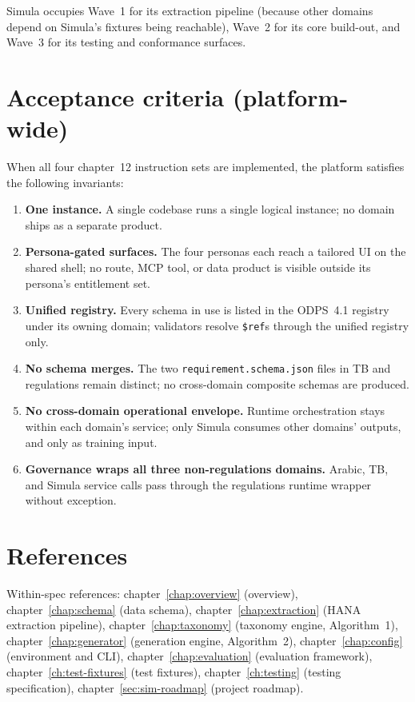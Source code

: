 Simula occupies Wave~1 for its extraction pipeline (because other
domains depend on Simula's fixtures being reachable), Wave~2 for its
core build-out, and Wave~3 for its testing and conformance surfaces.

\section{Acceptance criteria (platform-wide)}
\label{sec:agent-acceptance}
When all four chapter~12 instruction sets are implemented, the
platform satisfies the following invariants:

\begin{enumerate}
  \item \textbf{One instance.} A single codebase runs a single
    logical instance; no domain ships as a separate product.
  \item \textbf{Persona-gated surfaces.} The four personas each
    reach a tailored UI on the shared shell; no route, MCP tool, or
    data product is visible outside its persona's entitlement set.
  \item \textbf{Unified registry.} Every schema in use is listed in
    the ODPS~4.1 registry under its owning domain; validators
    resolve \texttt{\$ref}s through the unified registry only.
  \item \textbf{No schema merges.} The two
    \texttt{requirement.schema.json} files in TB and regulations
    remain distinct; no cross-domain composite schemas are produced.
  \item \textbf{No cross-domain operational envelope.} Runtime
    orchestration stays within each domain's service; only Simula
    consumes other domains' outputs, and only as training input.
  \item \textbf{Governance wraps all three non-regulations domains.}
    Arabic, TB, and Simula service calls pass through the
    regulations runtime wrapper without exception.
\end{enumerate}

\section{References}
\label{sec:agent-references}
Within-spec references:
chapter~\ref{chap:overview} (overview),
chapter~\ref{chap:schema} (data schema),
chapter~\ref{chap:extraction} (HANA extraction pipeline),
chapter~\ref{chap:taxonomy} (taxonomy engine, Algorithm~1),
chapter~\ref{chap:generator} (generation engine, Algorithm~2),
chapter~\ref{chap:config} (environment and CLI),
chapter~\ref{chap:evaluation} (evaluation framework),
chapter~\ref{ch:test-fixtures} (test fixtures),
chapter~\ref{ch:testing} (testing specification),
chapter~\ref{sec:sim-roadmap} (project roadmap).

